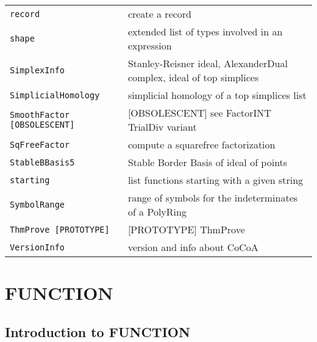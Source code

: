 \documentclass[a4paper]{mybook}
\begin{document}
\begin{center}
\begin{longtable}{ll}
{\verb~record~} &
      create a record\\
   
{\verb~shape~} &
      extended list of types involved in an expression\\
   
{\verb~SimplexInfo~} &
      Stanley-Reisner ideal, AlexanderDual complex, ideal of top simplices\\
   
{\verb~SimplicialHomology~} &
      simplicial homology of a top simplices list\\
   
{\verb~SmoothFactor [OBSOLESCENT]~} &
      [OBSOLESCENT] see FactorINT TrialDiv variant\\
   
{\verb~SqFreeFactor~} &
      compute a squarefree factorization\\
   
{\verb~StableBBasis5~} &
      Stable Border Basis of ideal of points\\
   
{\verb~starting~} &
      list functions starting with a given string\\
   
{\verb~SymbolRange~} &
      range of symbols for the indeterminates of a PolyRing\\
   
{\verb~ThmProve [PROTOTYPE]~} &
      [PROTOTYPE] ThmProve\\
   
{\verb~VersionInfo~} &
      version and info about CoCoA\\
   
\end{longtable}
\end{center}

\noindent



\chapter{FUNCTION}
\label{FUNCTION}

      

\section{Introduction to FUNCTION}
\label{Introduction to FUNCTION}
\end{document}
